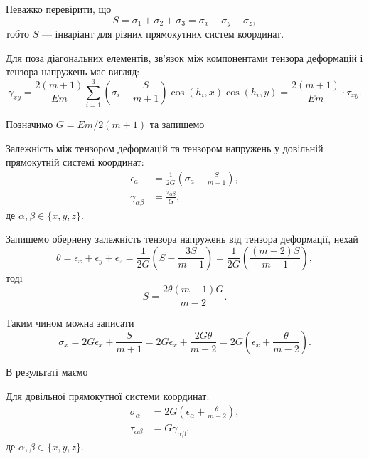 Неважко перевірити, що 
\begin{equation}
	S = \sigma_1 + \sigma_2 + \sigma_3 = \sigma_x + \sigma_y + \sigma_z,
\end{equation}
тобто $S$ --- інваріант для різних прямокутних систем координат. \medskip

Для поза діагональних елементів, зв'язок між компонентами тензора деформацій і тензора напружень має вигляд:
\begin{equation}
	\gamma_{x y} = \frac{2 (m + 1)}{E m} \sum_{i = 1}^3 \left( \sigma_i - \frac{S}{m + 1} \right) \cos (h_i, x) \cos (h_i, y) = \frac{2 (m + 1)}{E m} \cdot \tau_{x y}.
\end{equation}
 
Позначимо $G = E m / 2 (m + 1)$ та запишемо 
\begin{law}
	Залежність між тензором деформацій та тензором напружень у довільній прямокутній системі координат:
	\begin{align}
		\epsilon_a &= \frac{1}{2 G} \left(\sigma_a - \frac{S}{m + 1}\right), \\
		\gamma_{\alpha \beta} &= \frac{\tau_{\alpha \beta}}{G},
	\end{align}
	де $\alpha, \beta \in \{x, y, z\}$.
\end{law}

Запишемо обернену залежність тензора напружень від тензора деформації, нехай
\begin{equation}
	\theta = \epsilon_x + \epsilon_y + \epsilon_z = \frac{1}{2G} \left( S - \frac{3 S}{m + 1} \right) = \frac{1}{2 G} \left( \frac{(m - 2) S}{m +1} \right),
\end{equation}
тоді
\begin{equation}
	S = \frac{2 \theta (m + 1) G}{m - 2}.
\end{equation}

Таким чином можна записати
\begin{equation}
	\sigma_x = 2 G \epsilon_x + \frac{S}{m + 1} = 2 G \epsilon_x + \frac{2 G \theta}{m - 2} = 2 G \left( \epsilon_x + \frac{\theta}{m - 2} \right).
\end{equation}

В результаті маємо 
\begin{law}
	Для довільної прямокутної системи координат:
	\begin{align}
	    \label{eq:hooke-1}
		\sigma_\alpha &= 2 G \left( \epsilon_\alpha + \frac{\theta}{m - 2} \right), \\
		\label{eq:hooke-2}
		\tau_{\alpha \beta} &= G \gamma_{\alpha \beta},
	\end{align}
	де $\alpha, \beta \in \{x, y, z\}$.
\end{law}

